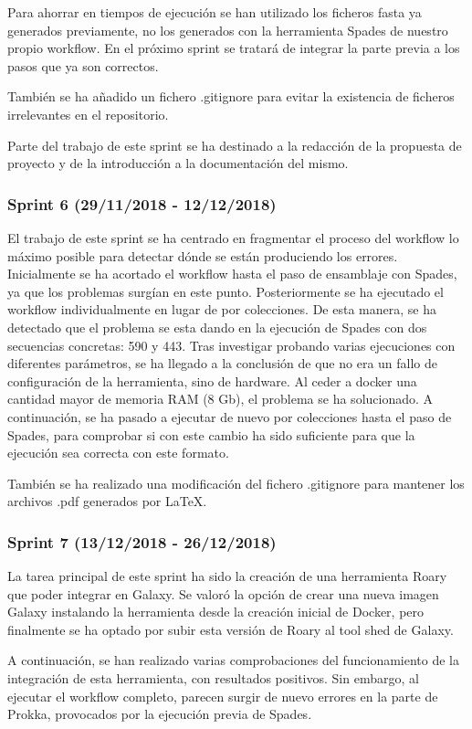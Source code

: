 Para ahorrar en tiempos de ejecución se han utilizado los ficheros fasta ya generados previamente, no los generados con la herramienta Spades de nuestro propio workflow. En el próximo sprint se tratará de integrar la parte previa a los pasos que ya son correctos.

También se ha añadido un fichero .gitignore para evitar la existencia de ficheros irrelevantes en el repositorio.

Parte del trabajo de este sprint se ha destinado a la redacción de la propuesta de proyecto y de la introducción a la documentación del mismo.

\subsubsection{Sprint 6 (29/11/2018 - 12/12/2018)}
El trabajo de este sprint se ha centrado en fragmentar el proceso del workflow lo máximo posible para detectar dónde se están produciendo los errores.
Inicialmente se ha acortado el workflow hasta el paso de ensamblaje con Spades, ya que los problemas surgían en este punto. Posteriormente se ha ejecutado el workflow individualmente en lugar de por colecciones. De esta manera, se ha detectado que el problema se esta dando en la ejecución de Spades con dos secuencias concretas: 590 y 443. Tras investigar probando varias ejecuciones con diferentes parámetros, se ha llegado a la conclusión de que no era un fallo de configuración de la herramienta, sino de hardware. Al ceder a docker una cantidad mayor de memoria RAM (8 Gb), el problema se ha solucionado. 
A continuación, se ha pasado a ejecutar de nuevo por colecciones hasta el paso de Spades, para comprobar si con este cambio ha sido suficiente para que la ejecución sea correcta con este formato. 

También se ha realizado una modificación del fichero .gitignore para mantener los archivos .pdf generados por LaTeX.

\subsubsection{Sprint 7 (13/12/2018 - 26/12/2018)}
La tarea principal de este sprint ha sido la creación de una herramienta Roary que poder integrar en Galaxy. Se valoró la opción de crear una nueva imagen Galaxy instalando la herramienta desde la creación inicial de Docker, pero finalmente se ha optado por subir esta versión de Roary al tool shed de Galaxy.

A continuación, se han realizado varias comprobaciones del funcionamiento de la integración de esta herramienta, con resultados positivos. Sin embargo, al ejecutar el workflow completo, parecen surgir de nuevo errores en la parte de Prokka, provocados por la ejecución previa de Spades. 

